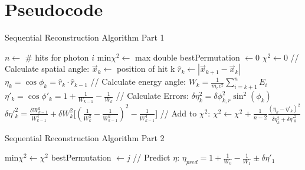 \chapter{Pseudocode}
\label{app:code}

\begin{algorithm}
\caption{Sequential Reconstruction Algorithm Part 1}\label{recon1}
\begin{algorithmic}
    \State $n \gets$ \# hits for photon $i$
    \State min$\chi^2 \gets$ max double
    \State bestPermutation $\gets 0$
        \State $\chi^2 \gets 0$
            \State // Calculate spatial angle:
            \State $\vec{x}_k \gets$ position of hit k
            \State $\hat{r}_k \gets |\vec{x}_{k+1} - \vec{x}_k|$ 
            \State $\eta_k = \cos{\phi_k} = \hat{r}_k\cdot\hat{r}_{k-1}$ 
            \State
            \State // Calculate energy angle:
            \State $W_k = \frac{1}{m_e c^2}\sum_{i=k+1}^n E_i$ 
            \State $\eta'_k = \cos{\phi'_k} = 1 + \frac{1}{W_{k-1}}-\frac{1}{W_k}$ 
            \State
            \State // Calculate Errors:
            \State $\delta\eta_k^2 = \delta\phi_{k,r}^2\sin^2(\phi_k)$ 
            \State $\delta\eta'^2_k = \frac{\delta W_{k-1}^2}{W_{k-1}^4}+\delta W_k^2 \big[(\frac{1}{W_k^2}-\frac{1}{W_{k-1}^2})^2 - \frac{1}{W_{k-1}^4}\big]$
            \State
            \State // Add to $\chi^2$:
            \State $\chi^2 \gets \chi^2 + \frac{1}{n-2} \frac{(\eta_k-\eta'_k)^2}{\delta\eta_k^2 + \delta\eta'^2_k}$
        \EndFor
\end{algorithmic}
\end{algorithm}
    
\begin{algorithm}
\caption{Sequential Reconstruction Algorithm Part 2}\label{recon2}
\begin{algorithmic}
        \State
        \State min$\chi^2 \gets \chi^2$
        \State bestPermutation $\gets j$
        \EndIf
    \EndFor
    \State
    \State // Predict $\eta$:
    \State $\eta_{pred} = 1 + \frac{1}{W_0}-\frac{1}{W_1} \pm \delta\eta'_1$
    \State
\EndFor
\end{algorithmic}
\end{algorithm}

